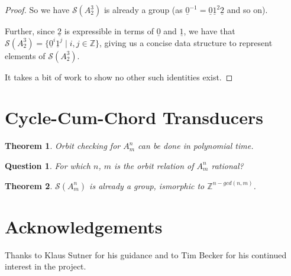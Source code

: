 \documentclass[a0,landscape, 16pt]{a0poster}
\theoremstyle{pleasant}
\newtheorem{theorem}{Theorem}
\newtheorem{question}{Question}
\newcommand{\0}{\underline{0}}
\newcommand{\1}{\underline{1}}
\newcommand{\2}{\underline{2}}
\newcommand{\Z}{\mathbb{Z}}
\renewcommand{\S}{\mathcal{S}}
\begin{document}
\begin{multicols}{3}
\begin{proof}
So we have $\S(A^3_2)$ is already a group (as $\0^{-1} = \0\1^2\2$ and so on).

Further, since $\2$ is expressible in terms of $\0$ and $\1$, we have that $\S(A^3_2) = \{ \0^i \1^j \mid i, j \in \Z \}$, giving us a concise data structure to represent elements of $\S(A^3_2)$.

It takes a bit of work to show no other such identities exist.
\end{proof}

\section*{Cycle-Cum-Chord Transducers}
\begin{theorem}
Orbit checking for $A^n_m$ can be done in polynomial time.
\end{theorem}

\begin{question}
For which $n$, $m$ is the orbit relation of $A^n_m$ rational?
\end{question}

\begin{theorem}
$\S(A^n_m)$ is already a group, ismorphic to $\Z^{n-gcd(n,m)}$.
\end{theorem}

\section*{Acknowledgements}

Thanks to Klaus Sutner for his guidance and to Tim Becker for his continued interest in the project.


\end{multicols}
\end{document}
